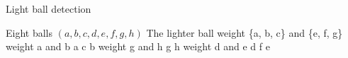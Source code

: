 \documentclass{article}
\begin{document}
\begin{algorithm}
    \caption{Light ball detection}
    \begin{algorithmic}[1]
    \Require Eight balls $(a, b, c, d, e, f, g, h)$
    \Ensure The lighter ball
    \State weight \{a, b, c\} and \{e, f, g\}
        \State weight a and b
                \State \Return a
            \Else
                    \State \Return c
                \Else 
                    \State \Return b 
                \EndIf
            \EndIf
    \Else
            \State weight g and h
                    \State \Return g
                \Else
                    \State \Return h
                \EndIf
        \Else
                \State weight d and e
                    \State \Return d
                \Else
                        \State \Return f
                    \Else 
                        \State \Return e 
                    \EndIf
                \EndIf      
        \EndIf
    \EndIf  
    \end{algorithmic}
\end{algorithm}
\clearpage
\end{document}
